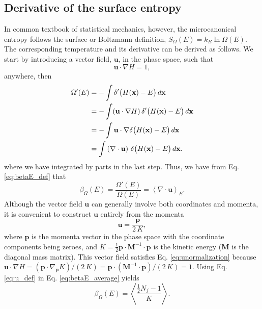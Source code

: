 \documentclass[reprint]{revtex4-1}
\begin{document}
\subsection{Derivative of the surface entropy}



In common textbook of statistical mechanics, however,
the microcanonical entropy
follows the surface or Boltzmann definition\cite{
  pearson1985, cagin1988, becker, dunkel2014, frenkel2015},
$S_\Omega(E) = k_B \ln \Omega(E)$.
%
The corresponding temperature and its derivative
can be derived as follows.
%
We start by introducing a vector field, $\mathbf u$,
in the phase space,
such that
%
\begin{equation}
  \mathbf u \cdot \nabla H = 1
  ,
  \label{eq:unormalization}
\end{equation}
%
anywhere, then
%
\begin{align}
  \Omega'(E)
  &= -\int \delta'\bigl( H(\mathbf x) - E \bigr) \, d\mathbf x
     \notag \\
  &= -\int (\mathbf u \cdot \nabla H) \,
           \delta'\bigl( H(\mathbf x) - E \bigr) \, d\mathbf x
     \notag \\
  &= -\int \mathbf u \cdot
           \nabla \delta\bigl( H(\mathbf x) - E \bigr) \, d\mathbf x
     \notag \\
  &= \int
     \left( \nabla \cdot \mathbf u \right) \,
     \delta\bigl( H(\mathbf x) - E \bigr) \, d\mathbf x
  .
  \notag
\end{align}
%
where we have integrated by parts in the last step.
%
Thus, we have from Eq. \eqref{eq:betaE_def} that
%
\begin{equation}
  \beta_\Omega(E)
  =
  \frac{ \Omega'(E) } { \Omega(E) }
  =
  \left\langle
    \nabla \cdot \mathbf u
  \right\rangle_E
  .
  \label{eq:betaE_average}
\end{equation}
%
Although the vector field $\mathbf u$ can generally
involve both coordinates and momenta,
it is convenient to construct $\mathbf u$
entirely from the momenta
%
\begin{equation}
  \mathbf u
  =
  \frac{ \mathbf p }
       {  2 \, K }
  ,
  \label{eq:u_def}
\end{equation}
where $\mathbf p$ is the momenta vector in the phase space
with the coordinate components being zeroes,
and $K = \frac 1 2 \mathbf p \cdot \mathbf M^{-1} \cdot \mathbf p$
is the kinetic energy ($\mathbf M$ is the diagonal mass matrix).
%
This vector field satisfies Eq. \eqref{eq:unormalization}
because
$\mathbf u \cdot \nabla H
= (\mathbf p \cdot \nabla_{\mathbf p} K)/(2 \, K)
= \mathbf p \cdot (\mathbf M^{-1} \cdot \mathbf p) / (2 \, K) = 1$.
%
Using Eq. \eqref{eq:u_def} in Eq. \eqref{eq:betaE_average}
yields
%
\begin{equation}
  \beta_\Omega(E)
  =
  \left\langle
    \frac{ \frac{1}{2}N_f - 1 } { K }
  \right\rangle
  .
  \label{eq:betaE_invK}
\end{equation}
\end{document}
